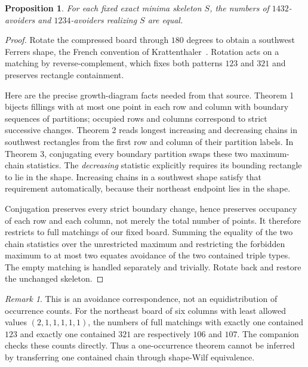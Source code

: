 \documentclass[11pt]{article}
\newtheorem{proposition}[theorem]{Proposition}
\theoremstyle{remark}\newtheorem{remark}[theorem]{Remark}
\begin{document}
\begin{proposition}\label{u1432:prop:refinement}
For each fixed exact minima skeleton $S$, the numbers of $1432$-avoiders
and $1234$-avoiders realizing $S$ are equal.
\end{proposition}
\begin{proof}
Rotate the compressed board through $180$ degrees to obtain a southwest
Ferrers shape, the French convention of Krattenthaler~\cite[Section 2]{Kratt}.
Rotation acts on a matching by reverse-complement, which fixes both
patterns $123$ and $321$ and preserves rectangle containment.

Here are the precise growth-diagram facts needed from that source.
Theorem 1 bijects fillings with at most one point in each row and column
with boundary sequences of partitions; occupied rows and columns
correspond to strict successive changes. Theorem 2 reads longest
increasing and decreasing chains in southwest rectangles from the first
row and column of their partition labels. In Theorem 3, conjugating every
boundary partition swaps these two maximum-chain statistics. The
\emph{decreasing} statistic explicitly requires its bounding rectangle
to lie in the shape. Increasing chains in a southwest shape satisfy that
requirement automatically, because their northeast endpoint lies in the
shape.

Conjugation preserves every strict boundary change, hence preserves
occupancy of each row and each column, not merely the total number of
points. It therefore restricts to full matchings of our fixed board.
Summing the equality of the two chain statistics over the unrestricted
maximum and restricting the forbidden maximum to at most two equates
avoidance of the two contained triple types. The empty matching is handled
separately and trivially. Rotate back and restore the unchanged skeleton.
\end{proof}

\begin{remark}\label{u1432:rem:notoccurrence}
This is an avoidance correspondence, not an equidistribution of
occurrence counts. For the northeast board of six columns with least
allowed values $(2,1,1,1,1,1)$, the numbers of full matchings with exactly
one contained $123$ and exactly one contained $321$ are respectively
$106$ and $107$. The companion checks these counts directly. Thus a
one-occurrence theorem cannot be inferred by transferring one contained
chain through shape-Wilf equivalence.
\end{remark}
\end{document}
